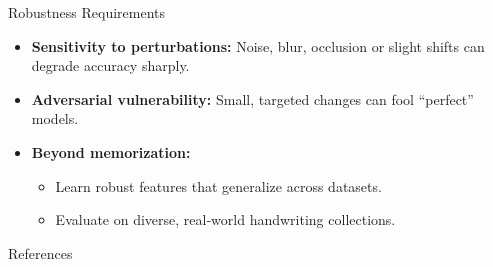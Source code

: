 \documentclass[german,10pt]{beamer}
\begin{document}
\begin{frame}{Robustness Requirements}
  \begin{itemize}
    \item \textbf{Sensitivity to perturbations:}
      Noise, blur, occlusion or slight shifts can degrade accuracy sharply.
    \item \textbf{Adversarial vulnerability:}
      Small, targeted changes can fool “perfect” models.
    \item \textbf{Beyond memorization:}
      \begin{itemize}
        \item Learn robust features that generalize across datasets.
        \item Evaluate on diverse, real‑world handwriting collections.
      \end{itemize}
  \end{itemize}
\end{frame}


\begin{frame}[allowframebreaks]{References}
  \tiny
  
\end{frame}
\end{document}
